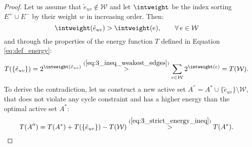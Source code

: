 \begin{proof}
Let us assume that $\tilde{e}_{uv} \notin \mathcal{W}$ and let $\intweight$ be the index sorting $E^+ \cup E^-$ by their weight $w$ in increasing order. Then:  
\begin{equation}
\intweight(\tilde{e}_{uv}) > \intweight(e), \quad \quad \forall \,e\in \mathcal{W} \label{eq:3_ineq_weakest_edges}
\end{equation}
and through the properties of the energy function $T$ defined in Equation \ref{eq:def_energy}:
\begin{equation}
T(\{\tilde{e}_{uv}\}) = 2^{\intweight(\tilde{e}_{uv})} \overset{(\ref{eq:3_ineq_weakest_edges})}{>} \sum_{e \in \mathcal{W}} 2^{\intweight(e)} = T( \mathcal{W} ). \label{eq:3_strict_energy_ineq}
\end{equation}
To derive the contradiction, let us construct a new active set $A^{''}=A^*\cup\{\tilde{e}_{uv}\} \setminus \mathcal{W}$, that does not violate any cycle constraint and has a higher energy than the optimal active set $A^*$:
\begin{equation}
T(A'') = T(A^*) + T(\{\tilde{e}_{uv}\}) - T( \mathcal{W} ) \overset{(\ref{eq:3_strict_energy_ineq})}{>}T(A^*).
\end{equation}
\end{proof}




